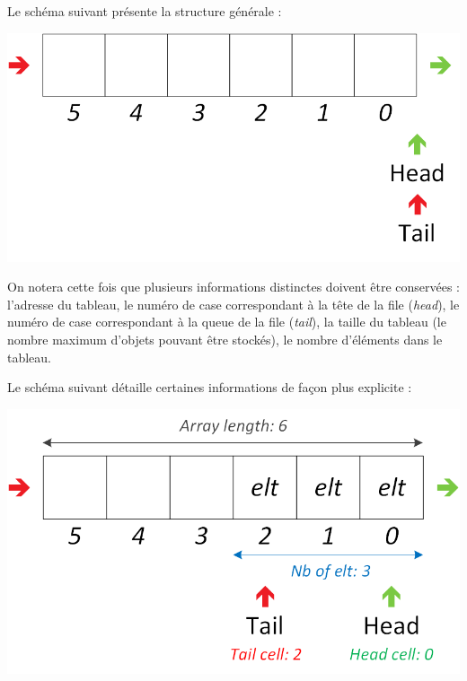 \documentclass[11pt,a4paper]{article}
\begin{document}
Le schéma suivant présente la structure générale :\\

\begin{center}
\includegraphics[scale=1]{img/files/Files_5_Tableau_Statique_Structure.png}
\end{center}

\smallskip

On notera cette fois que plusieurs informations distinctes doivent être conservées : l'adresse du tableau, le numéro de case correspondant à la tête de la file (\textit{head}), le numéro de case correspondant à la queue de la file (\textit{tail}), la taille du tableau (le nombre maximum d'objets pouvant être stockés), le nombre d'éléments dans le tableau.

Le schéma suivant détaille certaines informations de façon plus explicite :\\

\begin{center}
\includegraphics[scale=1]{img/files/Files_5_Tableau_Statique_Structure_Detaillee_1.png}
\end{center}
\end{document}
